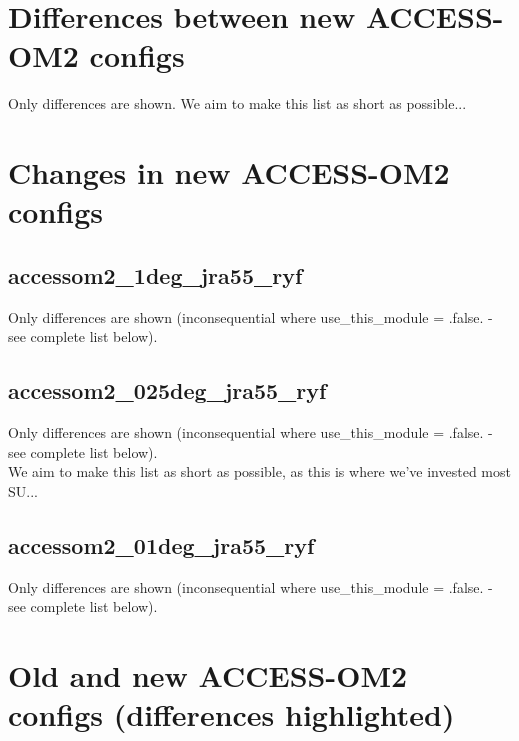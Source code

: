 \documentclass[10pt]{article}
\newcommand{\nmldiffer}[1]{#1} %
\newcommand{\doscript}[1]{{\footnotesize\textsf{}}}
\begin{document}
\newpage
\renewcommand{\nmldiffer}[1]{#1} %
\section{Differences between new ACCESS-OM2 configs}
Only differences are shown. We aim to make this list as short as possible...
\doscript{/Users/andy/anaconda/bin/python3 /Users/andy/bin/nmltab.py -d --format latex new_accessom2_1deg_jra55_ryf_input.nml new_accessom2_025deg_jra55_ryf_input.nml new_accessom2_01deg_jra55_ryf_input.nml}

\newpage
\section{Changes in new ACCESS-OM2 configs}
\subsection{accessom2_1deg_jra55_ryf}
Only differences are shown (inconsequential where use_this_module = .false. - see complete list below).
\doscript{/Users/andy/anaconda/bin/python3 /Users/andy/bin/nmltab.py -d --format latex original/hogg_accessom2_1deg_jra55_ryf_input.nml new_accessom2_1deg_jra55_ryf_input.nml }
\subsection{accessom2_025deg_jra55_ryf}
Only differences are shown (inconsequential where use_this_module = .false. - see complete list below).\\
We aim to make this list as short as possible, as this is where we've invested most SU...
\doscript{/Users/andy/anaconda/bin/python3 /Users/andy/bin/nmltab.py -d --format latex original/kiss_accessom2_025deg_jra55_ryf_input.nml new_accessom2_025deg_jra55_ryf_input.nml}
\subsection{accessom2_01deg_jra55_ryf}
Only differences are shown (inconsequential where use_this_module = .false. - see complete list below).
\doscript{/Users/andy/anaconda/bin/python3 /Users/andy/bin/nmltab.py -d --format latex original/hogg_accessom2_01deg_jra55_ryf_input.nml new_accessom2_01deg_jra55_ryf_input.nml}

\newpage
\section{Old and new ACCESS-OM2 configs (differences highlighted)}
\renewcommand{\nmldiffer}[1]{\colorbox{hilite}{#1}}\setlength{\fboxsep}{0pt} %
\doscript{/Users/andy/anaconda/bin/python3 /Users/andy/bin/nmltab.py --format latex original/hogg_accessom2_1deg_jra55_ryf_input.nml new_accessom2_1deg_jra55_ryf_input.nml original/kiss_accessom2_025deg_jra55_ryf_input.nml new_accessom2_025deg_jra55_ryf_input.nml original/hogg_accessom2_01deg_jra55_ryf_input.nml new_accessom2_01deg_jra55_ryf_input.nml}
\end{document}

